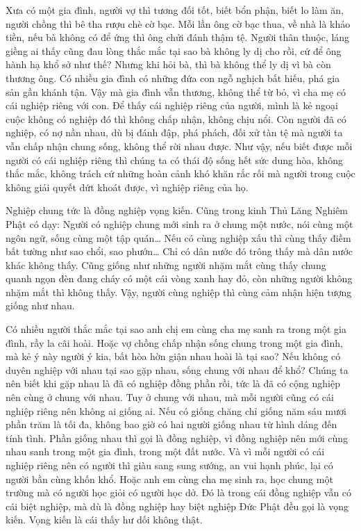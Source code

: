 \documentclass[
  12pt,
  oneside]{book}
\begin{document}
Xưa có một gia đình, người vợ thì tương đối tốt, biết bổn phận, biết lo làm ăn, người chồng thì bê tha rượu chè cờ bạc. Mỗi lần ông cờ bạc thua, về nhà là khảo tiền, nếu bà không có để ứng thì ông chửi đánh thậm tệ. Người thân thuộc, láng giềng ai thấy cũng đau lòng thắc mắc tại sao bà không ly dị cho rồi, cứ để ông hành hạ khổ sở như thế? Nhưng khi hỏi bà, thì bà không thể ly dị vì bà còn thương ông. Có nhiều gia đình có những đứa con ngỗ nghịch bất hiếu, phá gia sản gần khánh tận. Vậy mà gia đình vẫn thương, không thể từ bỏ, vì cha mẹ có cái nghiệp riêng với con. Để thấy cái nghiệp riêng của người, mình là kẻ ngoại cuộc không có nghiệp đó thì không chấp nhận, không chịu nổi. Còn người đã có nghiệp, có nợ nần nhau, dù bị đánh đập, phá phách, đối xử tàn tệ mà người ta vẫn chấp nhận chung sống, không thể rời nhau được. Như vậy, nếu biết được mỗi người có cái nghiệp riêng thì chúng ta có thái độ sống hết sức dung hòa, không thắc mắc, không trách cứ những hoàn cảnh khó khăn rắc rối mà người trong cuộc không giải quyết dứt khoát được, vì nghiệp riêng của họ.

Nghiệp chung tức là đồng nghiệp vọng kiến. Cũng trong kinh Thủ Lăng Nghiêm Phật có dạy: Người có nghiệp chung mới sinh ra ở chung một nước, nói cùng một ngôn ngữ, sống cùng một tập quán\ldots{} Nếu có cùng nghiệp xấu thì cùng thấy điềm bất tường như sao chổi, sao phướn\ldots{} Chỉ có dân nước đó trông thấy mà dân nước khác không thấy. Cũng giống như những người nhặm mắt cùng thấy chung quanh ngọn đèn đang cháy có một cái vòng xanh hay đỏ, còn những người không nhặm mắt thì không thấy. Vậy, người cùng nghiệp thì cùng cảm nhận hiện tượng giống như nhau.

Có nhiều người thắc mắc tại sao anh chị em cùng cha mẹ sanh ra trong một gia đình, rầy la cãi hoài. Hoặc vợ chồng chấp nhận sống chung trong một gia đình, mà kẻ ý này người ý kia, bất hòa hờn giận nhau hoài là tại sao? Nếu không có duyên nghiệp với nhau tại sao gặp nhau, sống chung với nhau để khổ? Chúng ta nên biết khi gặp nhau là đã có nghiệp đồng phần rồi, tức là đã có cộng nghiệp nên cùng ở chung với nhau. Tuy ở chung với nhau, mà mỗi người cũng có cái nghiệp riêng nên không ai giống ai. Nếu có giống chăng chỉ giống năm sáu mươi phần trăm là tối đa, không bao giờ có hai người giống nhau từ hình dáng đến tính tình. Phần giống nhau thì gọi là đồng nghiệp, vì đồng nghiệp nên mới cùng nhau sanh trong một gia đình, trong một đất nước. Và vì mỗi người có cái nghiệp riêng nên có người thì giàu sang sung sướng, an vui hạnh phúc, lại có người bần cùng khốn khổ. Hoặc anh em cùng cha mẹ sinh ra, học chung một trường mà có người học giỏi có người học dở. Đó là trong cái đồng nghiệp vẫn có cái biệt nghiệp, mà dù là đồng nghiệp hay biệt nghiệp Đức Phật đều gọi là vọng kiến. Vọng kiến là cái thấy hư dối không thật.
\end{document}
